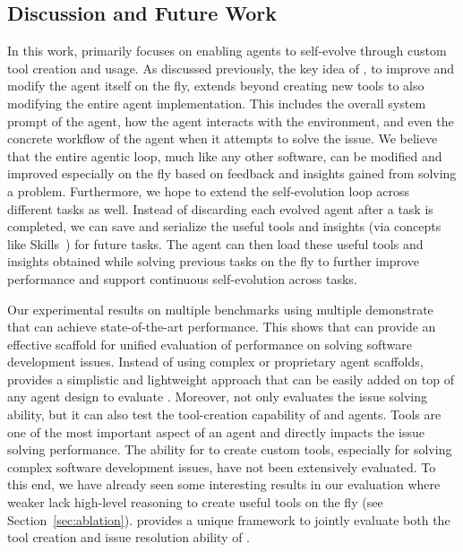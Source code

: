 \subsection{Discussion and Future Work}

In this work, \tech primarily focuses on enabling agents to self-evolve through custom tool creation and usage.
As discussed previously, the key idea of \tech, to improve and modify the agent itself on the fly, extends beyond creating new tools to also modifying the entire agent implementation.
This includes the overall system prompt of the agent, how the agent interacts with the environment, and even the concrete workflow of the agent when it attempts to solve the issue.
We believe that the entire agentic loop, much like any other software, can be modified and improved especially on the fly based on feedback and insights gained from solving a problem.
Furthermore, we hope to extend the self-evolution loop across different tasks as well.
Instead of discarding each evolved agent after a task is completed, we can save and
serialize the useful tools and insights (via concepts like Skills~\cite{skills}) for future tasks.
The agent can then load these useful tools and insights obtained while solving previous tasks on the fly  
to further improve performance and support continuous self-evolution across tasks.

Our experimental results on multiple benchmarks using multiple  demonstrate that \tech can achieve state-of-the-art performance.
This shows that \tech can provide an effective scaffold for unified evaluation of \llm performance on solving software development issues.
Instead of using complex or proprietary agent scaffolds, \tech provides a simplistic and lightweight approach that can be easily added on top of any agent design to evaluate . 
Moreover, \tech not only evaluates the issue solving ability, but it can also test the tool-creation capability of  and agents.
Tools are one of the most important aspect of an agent and directly impacts the issue solving performance.
The ability for  to create custom tools, especially for solving complex software development issues, have not been extensively evaluated.
To this end, we have already seen some interesting results in our evaluation where weaker  lack high-level reasoning to create useful tools on the fly (see Section~\ref{sec:ablation}).
\tech provides a unique framework to jointly evaluate both the tool creation and issue resolution ability of .

